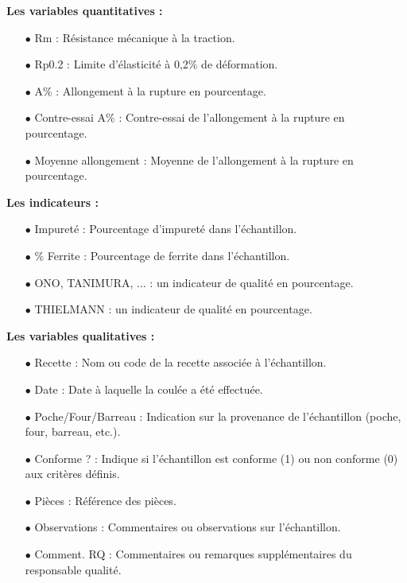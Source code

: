 \documentclass[12pt]{article}
\begin{document}
\vspace{0.5cm}

\textbf{Les variables quantitatives :}

\begin{itemize}
\item[$\bullet$] Rm : Résistance mécanique à la traction.
\item[$\bullet$] Rp0.2 : Limite d'élasticité à 0,2\% de déformation.
\item[$\bullet$] A\% : Allongement à la rupture en pourcentage.
\item[$\bullet$] Contre-essai A\% : Contre-essai de l'allongement à la rupture en pourcentage.
\item[$\bullet$] Moyenne allongement : Moyenne de l'allongement à la rupture en pourcentage.
\end{itemize}
    
\vspace{0.5cm}

\textbf{Les indicateurs :}

\begin{itemize}
\item[$\bullet$] Impureté : Pourcentage d'impureté dans l'échantillon.
\item[$\bullet$] \% Ferrite : Pourcentage de ferrite dans l'échantillon.
\item[$\bullet$] ONO, TANIMURA, ... : un indicateur de qualité en pourcentage.
\item[$\bullet$] THIELMANN : un indicateur de qualité en pourcentage.
\end{itemize}
 
\vspace{0.5cm}

\textbf{Les variables qualitatives :}

\begin{itemize}
\item[$\bullet$] Recette : Nom ou code de la recette associée à l'échantillon.
\item[$\bullet$] Date : Date à laquelle la coulée a été effectuée.
\item[$\bullet$] Poche/Four/Barreau : Indication sur la provenance de l'échantillon (poche, four, barreau, etc.).
\item[$\bullet$] Conforme ? : Indique si l'échantillon est conforme (1) ou non conforme (0) aux critères définis.
\item[$\bullet$] Pièces : Référence des pièces.
\item[$\bullet$] Observations : Commentaires ou observations sur l'échantillon.
\item[$\bullet$] Comment. RQ : Commentaires ou remarques supplémentaires du responsable qualité.
\end{itemize}
\end{document}
